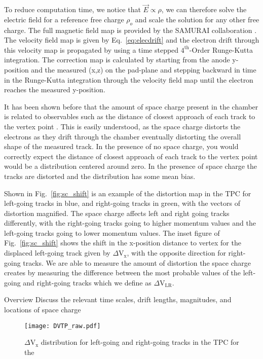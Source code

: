  To reduce computation time, we notice that $\vec{E}\propto \rho$, we can therefore solve the electric field for a reference free charge $\rho_o$ and scale the solution for any other free charge. The full magnetic field map is provided by the SAMURAI collaboration \cite{magnet}. The velocity field map is given by Eq.~\ref{eq:elecdrift} and the electron drift through this velocity map is propagated by using a time stepped $\mathrm{4}^{\mathrm{th}}$-Order Runge-Kutta integration. The correction map is calculated by starting from the anode y-position and the measured (x,z) on the pad-plane and stepping backward in time in the Runge-Kutta integration through the velocity field map until the electron reaches the measured y-position. 
 
 It has been shown before that the amount of space charge present in the chamber is related to observables such as the distance of closest approach of each track to the vertex point \cite{starSC}. This is easily understood, as the space charge distorts the electrons as they drift through the chamber eventually distorting the overall shape of the measured track. In the presence of no space charge, you would correctly expect the distance of closest approach of each track to the vertex point would be a distribution centered around zero. In the presence of space charge the tracks are distorted and the distribution has some mean bias. 

Shown in Fig.~\ref{fig:sc_shift} is an example of the distortion map in the TPC for left-going tracks in blue, and right-going tracks in green, with the vectors of distortion magnified. The space charge affects left and right going tracks differently, with the right-going tracks going to higher momentum values and the left-going tracks going to lower momentum values. The inset figure of Fig.~\ref{fig:sc_shift} shows the shift in the x-position distance to vertex for the displaced left-going track given by $\Delta\mathrm{V}_\mathrm{x}$, with the opposite direction for right-going tracks. We are able to measure the amount of distortion the space charge creates by measuring the difference between the most probable values of the left-going and right-going tracks which we define as $\Delta\mathrm{V}_\mathrm{LR}$.
 

Overview
Discuss the relevant time scales, drift lengths, magnitudes, and locations of space charge


\begin{figure}[H]
\texttt{[image: DVTP\_raw.pdf]}
\caption{$\Delta\mathrm{V}_\mathrm{x}$ distribution for left-going and right-going tracks in the TPC for the }
\label{fig:spacechg_cartoon}
\end{figure}



